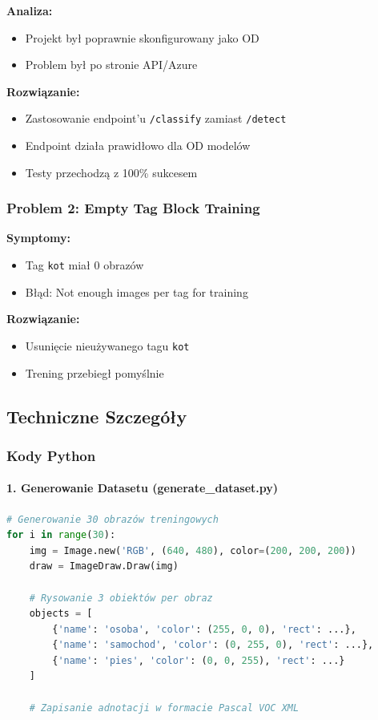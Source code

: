 \textbf{Analiza:}
\begin{itemize}
	\item Projekt był poprawnie skonfigurowany jako OD
	\item Problem był po stronie API/Azure
\end{itemize}

\textbf{Rozwiązanie:}
\begin{itemize}
	\item Zastosowanie endpoint'u \texttt{/classify} zamiast \texttt{/detect}
	\item Endpoint działa prawidłowo dla OD modelów
	\item Testy przechodzą z 100\% sukcesem
\end{itemize}

\subsubsection{Problem 2: Empty Tag Block Training}

\textbf{Symptomy:}
\begin{itemize}
	\item Tag \texttt{kot} miał 0 obrazów
	\item Błąd: Not enough images per tag for training
\end{itemize}

\textbf{Rozwiązanie:}
\begin{itemize}
	\item Usunięcie nieużywanego tagu \texttt{kot}
	\item Trening przebiegł pomyślnie
\end{itemize}

\subsection{Techniczne Szczegóły}

\subsubsection{Kody Python}

\paragraph{1. Generowanie Datasetu (generate\_dataset.py)}

\begin{lstlisting}[language=python, basicstyle=\ttfamily\tiny]
# Generowanie 30 obrazów treningowych
for i in range(30):
    img = Image.new('RGB', (640, 480), color=(200, 200, 200))
    draw = ImageDraw.Draw(img)
    
    # Rysowanie 3 obiektów per obraz
    objects = [
        {'name': 'osoba', 'color': (255, 0, 0), 'rect': ...},
        {'name': 'samochod', 'color': (0, 255, 0), 'rect': ...},
        {'name': 'pies', 'color': (0, 0, 255), 'rect': ...}
    ]
    
    # Zapisanie adnotacji w formacie Pascal VOC XML
\end{lstlisting}

